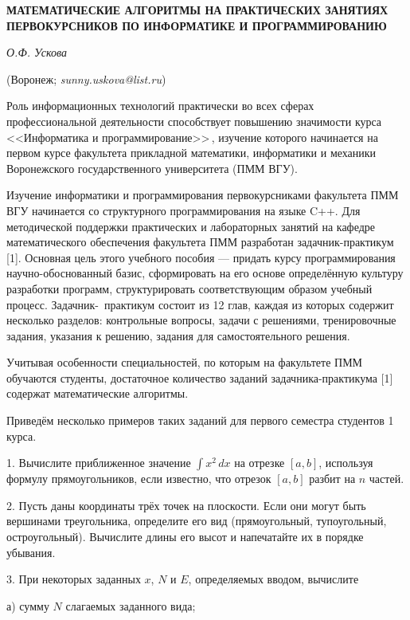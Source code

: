 \begin{center}
    {\bf МАТЕМАТИЧЕСКИЕ АЛГОРИТМЫ НА ПРАКТИЧЕСКИХ ЗАНЯТИЯХ ПЕРВОКУРСНИКОВ ПО ИНФОРМАТИКЕ И ПРОГРАММИРОВАНИЮ}

    {\it О.Ф. Ускова}

    (Воронеж; {\it sunny.uskova@list.ru})
\end{center}


Роль информационных технологий практически во всех сферах профессиональной деятельности способствует повышению значимости
курса <<Информатика и программирование>>\,, изучение которого начинается на первом курсе факультета прикладной математики,
информатики и механики Воронежского государственного университета \linebreak (ПММ ВГУ).

Изучение информатики и программирования первокурсниками факультета ПММ ВГУ начинается со структурного программирования
на языке C++. Для методической поддержки практических и лабораторных занятий на кафедре математического обеспечения
факультета ПММ разработан задачник-практикум [1]. Основная цель этого учебного пособия --- придать курсу программирования
научно-обоснованный базис, сформировать на его основе определённую культуру разработки программ, структурировать
соответствующим образом учебный процесс. Задачник-~практикум состоит из 12 глав, каждая из которых содержит несколько
разделов: контрольные вопросы, задачи с решениями, тренировочные задания, указания к решению, задания для самостоятельного
решения.

Учитывая особенности специальностей, по которым на факультете ПММ обучаются студенты, достаточное количество заданий
задачника-практикума [1] содержат математические алгоритмы.

Приведём несколько примеров таких заданий для первого семестра студентов 1 курса.

1. Вычислите приближенное значение $\int x^2\,dx$ на отрезке $[a, b]$, используя формулу прямоугольников, если
известно, что отрезок $[a, b]$ разбит на $n$ частей.

2. Пусть даны координаты трёх точек на плоскости. Если они могут быть вершинами треугольника, определите его
вид (прямоугольный, тупоугольный, остроугольный). Вычислите длины его высот и напечатайте их в порядке убывания.

3. При некоторых заданных $x$, $N$ и $E$, определяемых вводом, вычислите

а) сумму $N$ слагаемых заданного вида;

